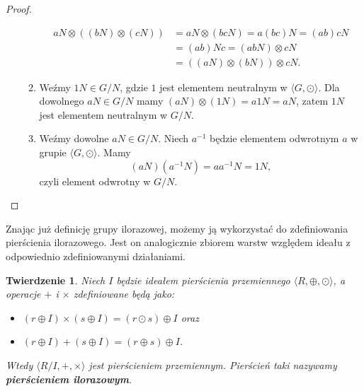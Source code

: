 \documentclass[declaration,shortabstract]{iithesis}
\theoremstyle{definition}
\theoremstyle{remark} \newtheorem{observation}{Obserwacja}
\theoremstyle{plain} \newtheorem{theorem}{Twierdzenie}
\theoremstyle{plain} \newtheorem{lemma}{Lemat}
\theoremstyle{remark} \newtheorem*{remark*}{Uwaga}
\theoremstyle{reminder} \newtheorem*{reminder*}{Przypomnienie}
\begin{document}
\begin{proof}
\begin{enumerate}[label=Ad.\arabic*., leftmargin=.4in]
\begin{enumerate}[label=Ad.2.\arabic*.]
\begin{align}
		      	      	aN\otimes((bN)\otimes(cN)) & = aN\otimes(bcN) = a(bc)N = (ab)cN \\
		      	      	                           & = (ab)Nc = (abN)\otimes cN         \\
		      	      	                           & = ((aN)\otimes(bN))\otimes cN.     
		      	      \end{align}
		      	\item Weźmy $1N \in G/N$, gdzie $1$ jest elementem neutralnym w $\langle G, \odot \rangle$. Dla dowolnego $aN \in G/N$ mamy $(aN)\otimes(1N) = a1N = aN$, zatem $1N$ jest elementem neutralnym w $G/N$.
		      	\item Weźmy dowolne $aN \in G/N$. Niech $a^{-1}$ będzie elementem odwrotnym $a$ w grupie $\langle G, \odot \rangle$. Mamy \[(aN)(a^{-1}N) = aa^{-1}N = 1N,\] czyli element odwrotny w $G/N$.
		      \end{enumerate}
	\end{enumerate}
\end{proof}

Znając już definicję grupy ilorazowej, możemy ją wykorzystać do zdefiniowania pierścienia ilorazowego. Jest on analogicznie zbiorem warstw względem ideału z odpowiednio zdefiniowanymi działaniami.

\begin{theorem}
	Niech $I$ będzie ideałem pierścienia przemiennego $\langle R, \oplus, \odot \rangle$, a operacje $+$ i $\times$ zdefiniowane będą jako: 
	\begin{itemize}[leftmargin=.4in]
		\item $(r \oplus I) \times (s \oplus I) = (r \odot s) \oplus I$ oraz
		\item $(r \oplus I) + (s \oplus I) = (r \oplus s) \oplus I$.
	\end{itemize}
	Wtedy $\langle R/I, +, \times \rangle$ jest pierścieniem przemiennym. Pierścień taki nazywamy \textbf{\textit{pierścieniem ilorazowym}}.
\end{theorem}

\end{document}
